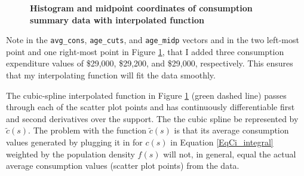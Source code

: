 \documentclass[letterpaper,12pt]{article}
\theoremstyle{definition}
\begin{document}
      \begin{figure}[htb]\centering\captionsetup{width=4.0in}
        \caption{\textbf{Histogram and midpoint coordinates of consumption summary data with interpolated function}}\label{FigCEXhistPointsInterp}
      \end{figure}

      Note in the \texttt{avg\_cons}, \texttt{age\_cuts}, and \texttt{age\_midp} vectors and in the two left-most point and one right-most point in Figure \ref{FigCEXhistPointsInterp}, that I added three consumption expenditure values of \$29,000, \$29,200, and \$29,000, respectively. This ensures that my interpolating function will fit the data smoothly.

      The cubic-spline interpolated function in Figure \ref{FigCEXhistPointsInterp} (green dashed line) passes through each of the scatter plot points and has continuously differentiable first and second derivatives over the support. The the cubic spline be represented by $\tilde{c}(s)$. The problem with the function $\tilde{c}(s)$ is that its average consumption values generated by plugging it in for $c(s)$ in Equation \ref{EqCi_integral} weighted by the population density $f(s)$ will not, in general, equal the actual average consumption values (scatter plot points) from the data.
\end{document}
